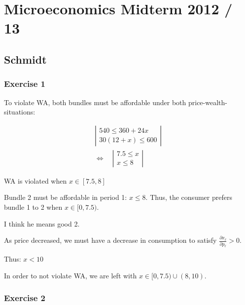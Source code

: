 \section*{Microeconomics Midterm 2012 / 13}

{
\subsection*{Schmidt}

\subsubsection*{Exercise 1}

\begin{enumerate}[label=(\alph*)]
{\item 
To violate WA, both bundles must be affordable under both price-wealth-situations:

\begin{align*}
    \left|\begin{array}{c}
    540 \leqslant 360+24 x \\
    30(12+x) \leqslant 600
    \end{array}\right| \\
    \Leftrightarrow \quad\left|\begin{array}{c}
    7.5 \leq x \\
    x \leq 8
    \end{array}\right|
\end{align*}

WA is violated when $x \in[7.5,8]$
}
{\item 
Bundle 2 must be affordable in period 1: $x \leq 8$.
Thus, the consumer prefers bundle 1 to 2 when $x \in[0,7.5)$.
}
{\item 
\color{red} I think he means good 2. \color{black}

As price decreased, we must have a decrease in consumption to satisfy $\frac{\partial x_\ell}{\partial p_\ell}>0$.

Thus: $x<10$

In order to not violate WA, we are left with $x \in[0,7.5) \cup (8,10)$.
}
\end{enumerate}
}

\subsubsection*{Exercise 2}

